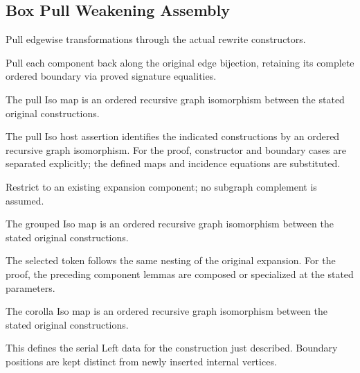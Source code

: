 \subsection{Box Pull Weakening Assembly}
Pull edgewise transformations through the actual rewrite constructors.

Pull each component back along the original edge bijection, retaining its complete ordered boundary via proved signature equalities.
\par{}

The pull Iso map is an ordered recursive graph isomorphism between the stated original constructions.
\par{}

The pull Iso host assertion identifies the indicated constructions by an ordered recursive graph isomorphism.
For the proof, constructor and boundary cases are separated explicitly; the defined maps and incidence equations are substituted.
\par{}

Restrict to an existing expansion component; no subgraph complement is assumed.
\par{}

The grouped Iso map is an ordered recursive graph isomorphism between the stated original constructions.
\par{}

The selected token follows the same nesting of the original expansion.
For the proof, the preceding component lemmas are composed or specialized at the stated parameters.
\par{}

The corolla Iso map is an ordered recursive graph isomorphism between the stated original constructions.
\par{}

This defines the serial Left data for the construction just described. Boundary positions are kept distinct from newly inserted internal vertices.
\par{}

